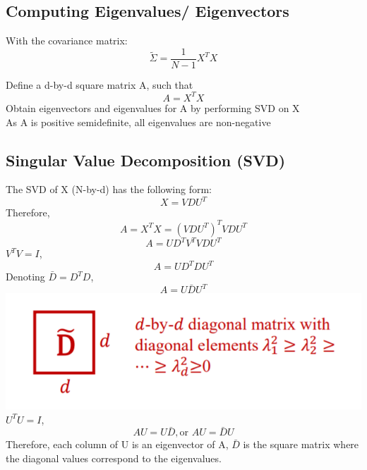 \subsection*{Computing Eigenvalues/ Eigenvectors}
With the covariance matrix:
\[\tilde{\Sigma} = \frac{1}{N-1}X^TX\]

Define a d-by-d square matrix A, such that
\[A = X^TX\]
Obtain eigenvectors and eigenvalues for A by performing SVD on X\\
As A is positive semidefinite, all eigenvalues are non-negative

\subsection*{Singular Value Decomposition (SVD)}
The SVD of X (N-by-d) has the following form:
\[X = VDU^T\]
Therefore,
\[A = X^TX = (VDU^T)^TVDU^T\]
\[A = UD^TV^TVDU^T\]
$V^TV = I$,
\[A = UD^TDU^T\]
Denoting $\bar{D} = D^T D$,
\[A = U\bar{D}U^T\]
\includegraphics[width=\linewidth]{fig/pca2.PNG}
$U^TU = I$,
\[AU = U\bar{D}, \text{or }AU = \bar{D}U\]
Therefore, each column of U is an eigenvector of A, $\bar{D}$
is the square matrix where the diagonal values correspond to the eigenvalues.
